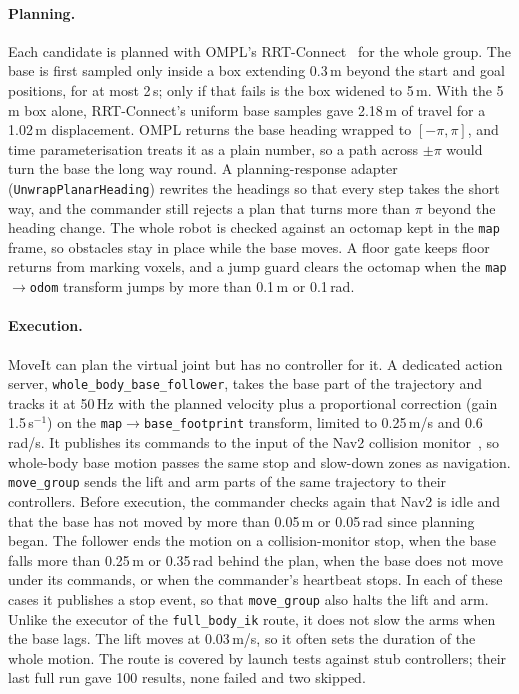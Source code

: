 \documentclass[12pt,a4paper]{article}
\begin{document}
\paragraph{Planning.}
Each candidate is planned with OMPL's RRT-Connect~\cite{kuffner2000} for the whole group. The base is
first sampled only inside a box extending 0.3\,m beyond the start and goal positions, for at most 2\,s;
only if that fails is the box widened to 5\,m. With the 5\,m box alone, RRT-Connect's uniform base
samples gave 2.18\,m of travel for a 1.02\,m displacement. OMPL returns the base heading wrapped to
$[-\pi,\pi]$, and time parameterisation treats it as a plain number, so a path across $\pm\pi$ would
turn the base the long way round. A planning-response adapter (\texttt{UnwrapPlanarHeading}) rewrites
the headings so that every step takes the short way, and the commander still rejects a plan that turns
more than $\pi$ beyond the heading change. The whole robot is checked against an octomap kept in the
\texttt{map} frame, so obstacles stay in place while the base moves. A floor gate keeps floor returns
from marking voxels, and a jump guard clears the octomap when the \texttt{map}$\to$\texttt{odom}
transform jumps by more than 0.1\,m or 0.1\,rad.

\paragraph{Execution.}
MoveIt can plan the virtual joint but has no controller for it. A dedicated action server,
\texttt{whole\_body\_base\_follower}, takes the base part of the trajectory and tracks it at 50\,Hz with
the planned velocity plus a proportional correction (gain 1.5\,s$^{-1}$) on the
\texttt{map}$\to$\texttt{base\_footprint} transform, limited to 0.25\,m/s and 0.6\,rad/s. It publishes
its commands to the input of the Nav2 collision monitor~\cite{nav2}, so whole-body base motion passes
the same stop and slow-down zones as navigation. \texttt{move\_group} sends the lift and arm parts of
the same trajectory to their controllers. Before execution, the commander checks again that Nav2 is idle
and that the base has not moved by more than 0.05\,m or 0.05\,rad since planning began. The follower
ends the motion on a collision-monitor stop, when the base falls more than 0.25\,m or 0.35\,rad behind
the plan, when the base does not move under its commands, or when the commander's heartbeat stops. In
each of these cases it publishes a stop event, so that \texttt{move\_group} also halts the lift and arm.
Unlike the executor of the \texttt{full\_body\_ik} route, it does not slow the arms when the base lags. The lift
moves at 0.03\,m/s, so it often sets the duration of the whole motion. The route is covered by launch
tests against stub controllers; their last full run gave 100 results, none failed and two skipped.
\end{document}
